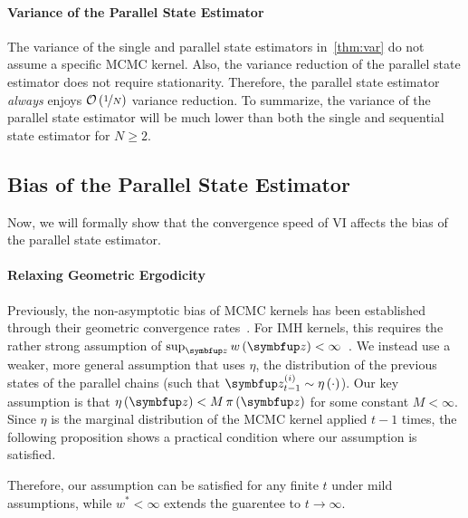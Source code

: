\vspace{-0.05in}
\paragraph{Variance of the Parallel State Estimator}
The variance of the single and parallel state estimators in~\cref{thm:var} do not assume a specific MCMC kernel.
Also, the variance reduction of the parallel state estimator does not require stationarity.
Therefore, the parallel state estimator \textit{always} enjoys \(\mathcal{O}\left(\nicefrac{1}{N}\right)\) variance reduction.
To summarize, the variance of the parallel state estimator will be much lower than both the single and sequential state estimator for \(N \geq 2\).

\vspace{-0.05in}
\subsection{Bias of the Parallel State Estimator}\label{section:bias}
\vspace{-0.05in}
Now, we will formally show that the convergence speed of VI affects the bias of the parallel state estimator.

\vspace{-0.05in}
\paragraph{Relaxing Geometric Ergodicity}
Previously, the non-asymptotic bias of MCMC kernels has been established through their geometric convergence rates~\citep{jiang_mcmc_2021}.
For IMH kernels, this requires the rather strong assumption of \(\sup_{\vz} w\left(\vz\right) < \infty\)~\citep{10.2307/2242610, wang_exact_2020}.
We instead use a weaker, more general assumption that uses \(\eta\), the distribution of the previous states of the parallel chains (such that \(\vz^{(i)}_{t-1} \sim \eta\left(\cdot\right)\)).
Our key assumption is that \(\eta\left(\vz\right) < M\,\pi\left(\vz\right)\) for some constant \(M < \infty\).
Since \(\eta\) is the marginal distribution of the MCMC kernel applied \(t-1\) times, the following proposition shows a practical condition where our assumption is satisfied.



Therefore, our assumption can be satisfied for any finite \(t\) under mild assumptions, while \(w^* < \infty\) extends the guarentee to \(t \rightarrow \infty\).

